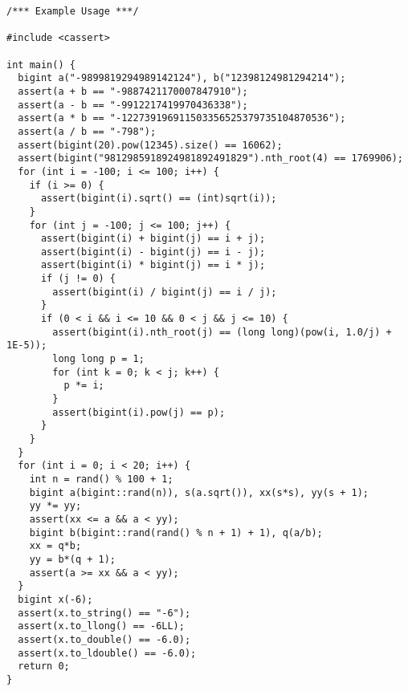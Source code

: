 \begin{lstlisting}
/*** Example Usage ***/

#include <cassert>

int main() {
  bigint a("-9899819294989142124"), b("12398124981294214");
  assert(a + b == "-9887421170007847910");
  assert(a - b == "-9912217419970436338");
  assert(a * b == "-122739196911503356525379735104870536");
  assert(a / b == "-798");
  assert(bigint(20).pow(12345).size() == 16062);
  assert(bigint("9812985918924981892491829").nth_root(4) == 1769906);
  for (int i = -100; i <= 100; i++) {
    if (i >= 0) {
      assert(bigint(i).sqrt() == (int)sqrt(i));
    }
    for (int j = -100; j <= 100; j++) {
      assert(bigint(i) + bigint(j) == i + j);
      assert(bigint(i) - bigint(j) == i - j);
      assert(bigint(i) * bigint(j) == i * j);
      if (j != 0) {
        assert(bigint(i) / bigint(j) == i / j);
      }
      if (0 < i && i <= 10 && 0 < j && j <= 10) {
        assert(bigint(i).nth_root(j) == (long long)(pow(i, 1.0/j) + 1E-5));
        long long p = 1;
        for (int k = 0; k < j; k++) {
          p *= i;
        }
        assert(bigint(i).pow(j) == p);
      }
    }
  }
  for (int i = 0; i < 20; i++) {
    int n = rand() % 100 + 1;
    bigint a(bigint::rand(n)), s(a.sqrt()), xx(s*s), yy(s + 1);
    yy *= yy;
    assert(xx <= a && a < yy);
    bigint b(bigint::rand(rand() % n + 1) + 1), q(a/b);
    xx = q*b;
    yy = b*(q + 1);
    assert(a >= xx && a < yy);
  }
  bigint x(-6);
  assert(x.to_string() == "-6");
  assert(x.to_llong() == -6LL);
  assert(x.to_double() == -6.0);
  assert(x.to_ldouble() == -6.0);
  return 0;
}
\end{lstlisting}

